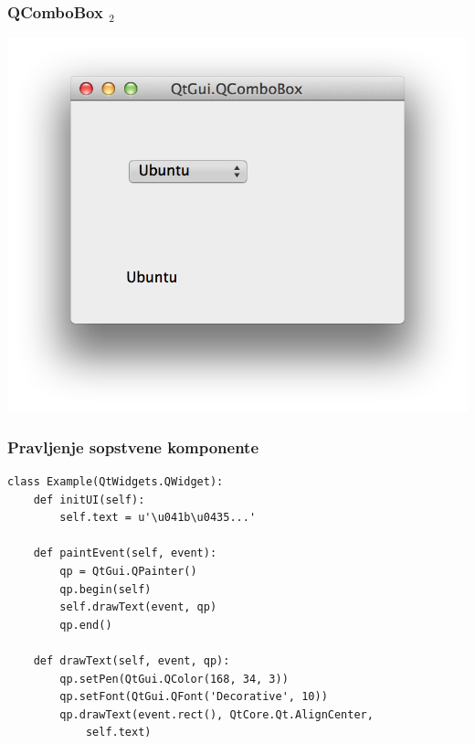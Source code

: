 \documentclass[utf8,compress,aspectratio=169]{beamer}
\begin{document}
\begin{frame}[fragile]
  \frametitle{QComboBox $_2$}
\begin{center}
\includegraphics[scale=0.5]{pyqt16.png}
\end{center}
\end{frame}

\begin{frame}
  \frametitle{Pravljenje sopstvene komponente}
\begin{verbatim}
class Example(QtWidgets.QWidget):
    def initUI(self):
        self.text = u'\u041b\u0435...'

    def paintEvent(self, event):
        qp = QtGui.QPainter()
        qp.begin(self)
        self.drawText(event, qp)
        qp.end()

    def drawText(self, event, qp):
        qp.setPen(QtGui.QColor(168, 34, 3))
        qp.setFont(QtGui.QFont('Decorative', 10))
        qp.drawText(event.rect(), QtCore.Qt.AlignCenter,
            self.text)
\end{verbatim}
\end{frame}
\end{document}

